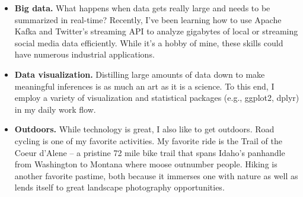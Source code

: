 \documentclass[11pt,letterpaper,sans]{moderncv}        %
\begin{document}
\begin{itemize}



\item{\textbf{Big data.} What happens when data gets really large and needs to be summarized in real-time? Recently, I've been learning how to use Apache Kafka and Twitter's streaming API to analyze gigabytes of local or streaming social media data efficiently. While it's a hobby of mine, these skills could have numerous industrial applications.}

\vspace{4pt}

\item{\textbf{Data visualization.} Distilling large amounts of data down to make meaningful inferences is as much an art as it is a science. To this end, I employ a variety of visualization and statistical packages (e.g., ggplot2, dplyr) in my daily work flow.}

\vspace{4pt}

\item{\textbf{Outdoors.} While technology is great, I also like to get outdoors. Road cycling is one of my favorite activities. My favorite ride is the Trail of the Coeur d'Alene -- a pristine 72 mile bike trail that spans Idaho's panhandle from Washington to Montana where moose outnumber people. Hiking is another favorite pastime, both because it immerses one with nature as well as lends itself to great landscape photography opportunities.}

\vspace{4pt}


\end{itemize}





\end{document}
